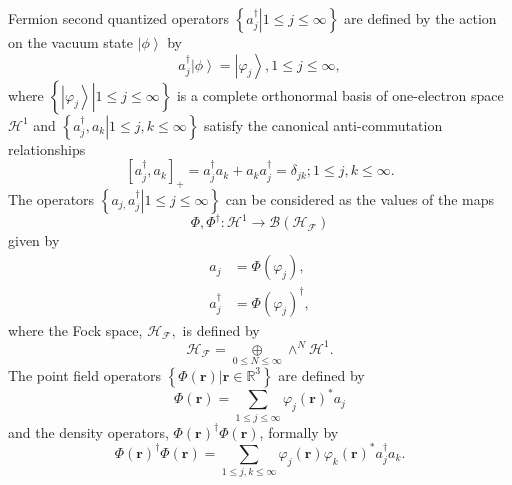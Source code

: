 \documentclass[aps,preprint]{revtex4}%
\begin{document}
Fermion second quantized operators $\left\{  \left.  a_{j}^{\dagger
}\right\vert 1\leq j\leq\infty\right\}  $ are defined by the action on the
vacuum state $\left\vert \phi\right\rangle $ by
\begin{equation}
a_{j}^{\dagger}\left\vert \phi\right\rangle =\left\vert \varphi_{j}%
\right\rangle ,1\leq j\leq\infty,
\end{equation}
where $\left\{  \left.  \left\vert \varphi_{j}\right\rangle \right\vert 1\leq
j\leq\infty\right\}  $ is a complete orthonormal basis of one-electron space
$\mathcal{H}^{1}$ and $\left\{  \left.  a_{j}^{\dagger},a_{k}\right\vert 1\leq
j,k\leq\infty\right\}  $ satisfy the canonical anti-commutation relationships
\begin{equation}
\left[  a_{j}^{\dagger},a_{k}\right]  _{+}=a_{j}^{\dagger}a_{k}+a_{k}%
a_{j}^{\dagger}=\delta_{jk};1\leq j,k\leq\infty.
\end{equation}
The operators $\left\{  \left.  a_{j,}a_{j}^{\dagger}\right\vert 1\leq
j\leq\infty\right\}  $ can be considered as the values of the maps
\begin{equation}
\Phi,\Phi^{\dagger}:\mathcal{H}^{1}\rightarrow\mathcal{B}\left(
\mathcal{H}_{\mathcal{F}}\right)
\end{equation}
given by
\begin{align}
a_{j}  &  =\Phi\left(  \varphi_{j}\right)  ,\nonumber\\
a_{j}^{\dagger}  &  =\Phi\left(  \varphi_{j}\right)  ^{\dagger},
\end{align}
where the Fock space, $\mathcal{H}_{\mathcal{F}},$ is defined by
\begin{equation}
\mathcal{H}_{\mathcal{F}}=\underset{0\leq N\leq\infty}{\oplus}\wedge
^{N}\mathcal{H}^{1}.
\end{equation}
The point field operators $\left\{  \left.  \Phi\left(  \boldsymbol{r}\right)
\right\vert \boldsymbol{r\in}\mathbb{R}^{3}\right\}  $ are defined by
\cite{Thirring}
\begin{equation}
\Phi\left(  \boldsymbol{r}\right)  =\sum_{1\leq j\leq\infty}\varphi_{j}\left(
\boldsymbol{r}\right)  ^{\ast}a_{j}%
\end{equation}
and the density operators, $\Phi\left(  \boldsymbol{r}\right)  ^{\dagger}%
\Phi\left(  \boldsymbol{r}\right)  $, formally by
\begin{equation}
\Phi\left(  \boldsymbol{r}\right)  ^{\dagger}\Phi\left(  \boldsymbol{r}%
\right)  =\sum_{1\leq j,k\leq\infty}\varphi_{j}\left(  \boldsymbol{r}\right)
\varphi_{k}\left(  \boldsymbol{r}\right)  ^{\ast}a_{j}^{\dagger}a_{k}.
\end{equation}
\end{document}
